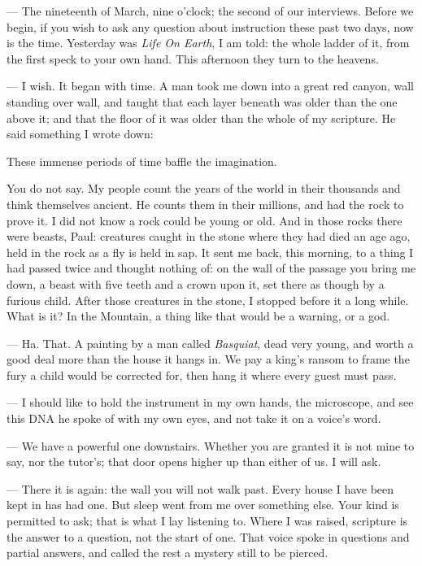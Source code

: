
\begin{room}

--- The nineteenth of March, nine o'clock; the second of our interviews. Before we begin, if you wish to ask any question about instruction these past two days, now is the time. Yesterday was \textit{Life On Earth}, I am told: the whole ladder of it, from the first speck to your own hand. This afternoon they turn to the heavens.

--- I wish. It began with time. A man took me down into a great red canyon, wall standing over wall, and taught that each layer beneath was older than the one above it; and that the floor of it was older than the whole of my scripture. He said something I wrote down:

\begin{scripture}
These immense periods of time baffle the imagination.
\end{scripture}

You do not say. My people count the years of the world in their thousands and think themselves ancient. He counts them in their millions, and had the rock to prove it. I did not know a rock could be young or old. And in those rocks there were beasts, Paul: creatures caught in the stone where they had died an age ago, held in the rock as a fly is held in sap. It sent me back, this morning, to a thing I had passed twice and thought nothing of: on the wall of the passage you bring me down, a beast with five teeth and a crown upon it, set there as though by a furious child. After those creatures in the stone, I stopped before it a long while. What is it? In the Mountain, a thing like that would be a warning, or a god.

--- Ha. That. A painting by a man called \textit{Basquiat}, dead very young, and worth a good deal more than the house it hangs in. We pay a king's ransom to frame the fury a child would be corrected for, then hang it where every guest must pass.

--- I should like to hold the instrument in my own hands, the microscope, and see this DNA he spoke of with my own eyes, and not take it on a voice's word.

--- We have a powerful one downstairs. Whether you are granted it is not mine to say, nor the tutor's; that door opens higher up than either of us. I will ask.

--- There it is again: the wall you will not walk past. Every house I have been kept in has had one. But sleep went from me over something else. Your kind is permitted to ask; that is what I lay listening to. Where I was raised, scripture is the answer to a question, not the start of one. That voice spoke in questions and partial answers, and called the rest a mystery still to be pierced.


\end{room}
